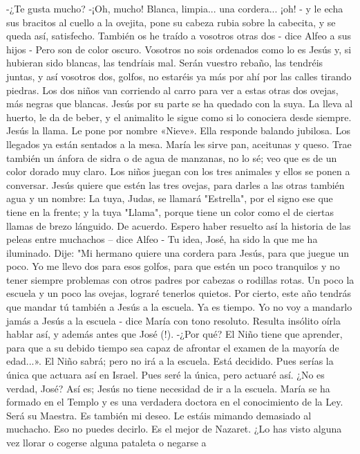 \documentclass[12pt]{book} %
\begin{document}
-¿Te gusta mucho? 
-¡Oh, mucho! Blanca, limpia... una cordera... ¡oh! - y le echa sus bracitos al cuello a la ovejita, pone su cabeza rubia 
sobre la cabecita, y se queda así, satisfecho. 
También os he traído a vosotros otras dos - dice Alfeo a sus hijos - Pero son de color oscuro. Vosotros no sois ordenados como lo es Jesús y, si hubieran sido blancas, las tendríais mal. Serán vuestro rebaño, las tendréis juntas, y así vosotros dos, golfos, no estaréis ya más por ahí por las calles tirando piedras. 
Los dos niños van corriendo al carro para ver a estas otras dos ovejas, más negras que blancas. 
Jesús por su parte se ha quedado con la suya. La lleva al huerto, le da de beber, y el animalito le sigue como si lo 
conociera desde siempre. Jesús la llama. Le pone por nombre «Nieve». Ella responde balando jubilosa. 
Los llegados ya están sentados a la mesa. María les sirve pan, aceitunas y queso. Trae también un ánfora de sidra o de 
agua de manzanas, no lo sé; veo que es de un color dorado muy claro. 
Los niños juegan con los tres animales y ellos se ponen a conversar. Jesús quiere que estén las tres ovejas, para darles a 
las otras también agua y un nombre: 
La tuya, Judas, se llamará "Estrella", por el signo ese que tiene en la frente; y la tuya "Llama", porque tiene un color 
como el de ciertas llamas de brezo lánguido. 
De acuerdo. 
Espero haber resuelto así la historia de las peleas entre muchachos – dice Alfeo - Tu idea, José, ha sido la que me ha iluminado. Dije: "Mi hermano quiere una cordera para Jesús, para que juegue un poco. Yo me llevo dos para esos golfos, para que estén un poco tranquilos y no tener siempre problemas con otros padres por cabezas o rodillas rotas. Un poco la escuela y un poco las ovejas, lograré tenerlos quietos. Por cierto, este año tendrás que mandar tú también a Jesús a la escuela. Ya es tiempo. 
Yo no voy a mandarlo jamás a Jesús a la escuela - dice María con tono resoluto. Resulta insólito oírla hablar así, y 
además antes que José (!). 
-¿Por qué? El Niño tiene que aprender, para que a su debido tiempo sea capaz de afrontar el examen de la mayoría de 
edad...». 
El Niño sabrá; pero no irá a la escuela. Está decidido. 
Pues serías la única que actuara así en Israel. 
Pues seré la única, pero actuaré así. ¿No es verdad, José? 
Así es; Jesús no tiene necesidad de ir a la escuela. María se ha formado en el Templo y es una verdadera doctora en el 
conocimiento de la Ley. Será su Maestra. Es también mi deseo. 
Le estáis mimando demasiado al muchacho. 
Eso no puedes decirlo. Es el mejor de Nazaret. ¿Lo has visto alguna vez llorar o cogerse alguna pataleta o negarse a 
\end{document}
